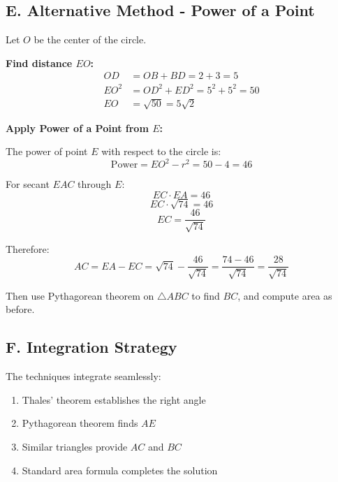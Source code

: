 \documentclass[]{article}
\begin{document}
\begin{techniquesbox}
\subsection*{E. Alternative Method - Power of a Point}

Let $O$ be the center of the circle.

\textbf{Find distance $EO$:}
\begin{align*}
OD &= OB + BD = 2 + 3 = 5\\
EO^2 &= OD^2 + ED^2 = 5^2 + 5^2 = 50\\
EO &= \sqrt{50} = 5\sqrt{2}
\end{align*}

\textbf{Apply Power of a Point from $E$:}

The power of point $E$ with respect to the circle is:
\[\text{Power} = EO^2 - r^2 = 50 - 4 = 46\]

For secant $EAC$ through $E$:
\[EC \cdot EA = 46\]
\[EC \cdot \sqrt{74} = 46\]
\[EC = \frac{46}{\sqrt{74}}\]

Therefore:
\[AC = EA - EC = \sqrt{74} - \frac{46}{\sqrt{74}} = \frac{74 - 46}{\sqrt{74}} = \frac{28}{\sqrt{74}}\]

Then use Pythagorean theorem on $\triangle ABC$ to find $BC$, and compute area as before.

\subsection*{F. Integration Strategy}
The techniques integrate seamlessly:
\begin{enumerate}
    \item Thales' theorem establishes the right angle
    \item Pythagorean theorem finds $AE$
    \item Similar triangles provide $AC$ and $BC$
    \item Standard area formula completes the solution
\end{enumerate}
\end{techniquesbox}
\end{document}
